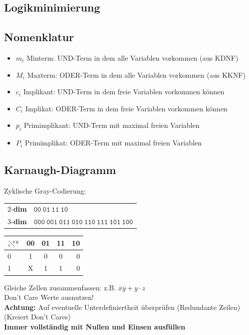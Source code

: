 \documentclass[6pt,a4paper]{scrartcl}
\renewcommand{\emph}[1]{\textsf{\textbf{#1}}}
\begin{document}
\begin{multicols*}{3}
\section{Logikminimierung}
	\subsection{Nomenklatur}
	\begin{itemize}\itemsep0pt
	\item $m_i$ Minterm: UND-Term in dem alle Variablen vorkommen (aus KDNF)
	\item $M_i$ Maxterm: ODER-Term in dem alle Variablen vorkommen (aus KKNF)
	\item $c_i$ Implikant: UND-Term in dem freie Variablen vorkommen können
	\item $C_i$ Implikat: ODER-Term in dem freie Variablen vorkommen können
	\item $p_i$ Primimplikant: UND-Term mit maximal freien Variablen
	\item $P_i$ Primimplikat: ODER-Term mit maximal freien Variablen
	\end{itemize}

	\subsection{Karnaugh-Diagramm} %
		Zyklische Gray-Codierung:
    \begin{tabular}{ r|l }
      2-\textbf{dim}& $\mathtt{00} ~ \mathtt{01} ~ \mathtt{11} ~ \mathtt{10}$ \\
      3-\textbf{dim}& $\mathtt{000} ~ \mathtt{001} ~ \mathtt{011} ~ \mathtt{010} ~ \mathtt{110} ~ \mathtt{111} ~ \mathtt{101} ~ \mathtt{100}$
    \end{tabular}

	\begin{tabular}{l | c | c |  c | r}
	$_z\!\!\diagdown \!\!^{xy}$ & 00 	& 	01	&	11 	&	10	 	\\ \midrule
	0		&	1 \cellcolor{gray}	&	0	&	0	&	0		\\
	1		&	X \cellcolor{gray}	&	1 \cellcolor{lightgray}	&	1 \cellcolor{lightgray}	&	0		\\
	\end{tabular}
	Gleiche Zellen zusammenfassen: z.B. $\overline x \overline y + y \cdot z$\\
	Don't Care Werte ausnutzen!\\
	\emph{Achtung:} Auf eventuelle Unterdefiniertheit überprüfen (Redundante Zeilen) (Kreiert Don't Cares)\\
	\emph{Immer vollständig mit Nullen und Einsen ausfüllen}


\end{multicols*}
\end{document}
